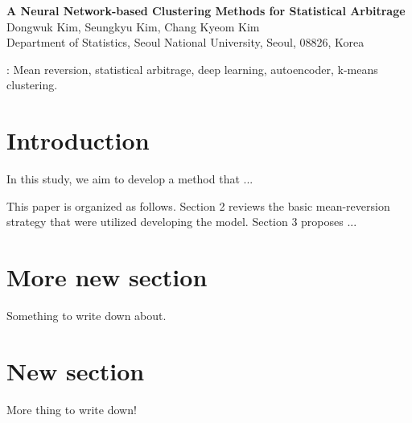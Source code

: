 \documentclass[11pt]{article}
\begin{document}
\begin{center}
{\bf\LARGE A Neural Network-based Clustering Methods for Statistical Arbitrage}
\vspace{.5cm}\\
 Dongwuk Kim, Seungkyu Kim, Chang Kyeom Kim \\
Department of Statistics, Seoul National University, Seoul, 08826,
Korea\\
\end{center}


\begin{abstract}
This paper aims to propose a novel hybrid of classical statistical arbitrage problem and deep learning framework. 
\end{abstract}

: Mean reversion, statistical arbitrage, deep learning, autoencoder, k-means clustering.



\section{Introduction}

In this study, we aim to develop a method that ...



This paper is organized as follows. Section 2 reviews the basic mean-reversion strategy that were utilized developing the model. Section 3 proposes ...





\section{More new section}

Something to write down about.





\section{New section}
More thing to write down!
\end{document}

